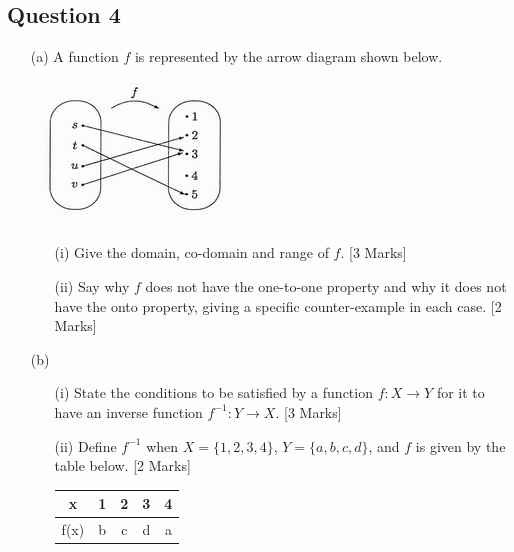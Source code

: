 \documentclass[a4paper,12pt]{article}
\begin{document}
\subsection*{Question 4}

\begin{itemize}
\item[(a)] A function $f$ is represented by the arrow diagram shown below.
\begin{center}
\includegraphics[scale=0.75]{HibCollArrow.jpg}
\end{center}

\begin{itemize}
\item[(i)] Give the domain, co-domain and range of $f$. [3 Marks]
\item[(ii)] Say why $f$ does not have the one-to-one property and why it does not
have the onto property, giving a specific counter-example in each case. [2 Marks]
\end{itemize}
\item[(b)]
\begin{itemize}
\item[(i)] State the conditions to be satisfied by a function $f : X \rightarrow Y$ for it to have
an inverse function $f^{-1} : Y \rightarrow X$. [3 Marks]
\item[(ii)] Define $f^{-1}$ when $X = \{1,2,3,4\}$, $Y = \{a,b,c,d\}$, and $f$ is given by the
table below. [2 Marks] \\
\begin{center}
\begin{tabular}{|c|cccc|}
  \hline
  x & 1 & 2 & 3 & 4 \\ \hline
  f(x) & b & c & d & a \\
  \hline
\end{tabular}
\end{center}
\end{itemize}
\end{itemize}
\end{document}
